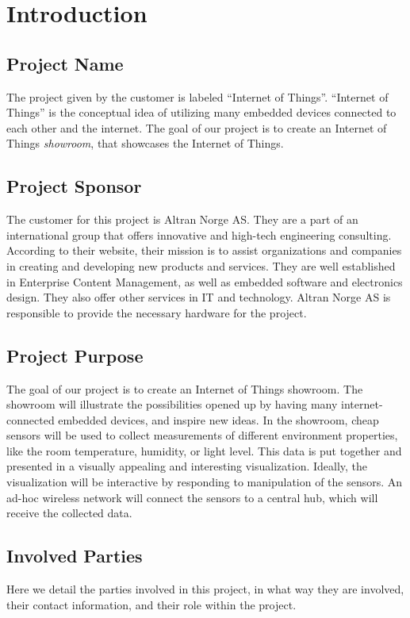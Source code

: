 ﻿\documentclass[../document.tex]{subfiles}
\begin{document}
\section{Introduction}


\subsection{Project Name}

The project given by the customer is labeled ``Internet of Things''. ``Internet of Things'' is the conceptual idea of utilizing many embedded devices connected to each other and the internet. The goal of our project is to create an Internet of Things \emph{showroom}, that showcases the Internet of Things.


\subsection{Project Sponsor}

The customer for this project is Altran Norge AS. They are a part of an international group that offers innovative and high-tech engineering consulting. According to their website, their mission is to assist organizations and companies in creating and developing new products and services. They are well established in Enterprise Content Management, as well as embedded software and electronics design. They also offer other services in IT and technology. Altran Norge AS is responsible to provide the necessary hardware for the project.

\subsection{Project Purpose}
The goal of our project is to create an Internet of Things showroom. The showroom will illustrate the possibilities opened up by having many internet-connected embedded devices, and inspire new ideas. In the showroom, cheap sensors will be used to collect measurements of different environment properties, like the room temperature, humidity, or light level. This data is put together and presented in a visually appealing and interesting visualization. Ideally, the visualization will be interactive by responding to manipulation of the sensors. An ad-hoc wireless network will connect the sensors to a central hub, which will receive the collected data.

\subsection{Involved Parties}
Here we detail the parties involved in this project, in what way they are involved, their contact information, and their role within the project.
\end{document}
